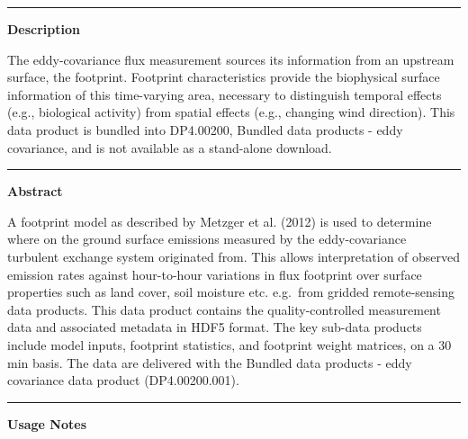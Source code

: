 \documentclass[]{article}
\begin{document}
\begin{center}\rule{0.5\linewidth}{\linethickness}\end{center}

\textbf{Description}

The eddy-covariance flux measurement sources its information from an
upstream surface, the footprint. Footprint characteristics provide the
biophysical surface information of this time-varying area, necessary to
distinguish temporal effects (e.g., biological activity) from spatial
effects (e.g., changing wind direction). This data product is bundled
into DP4.00200, Bundled data products - eddy covariance, and is not
available as a stand-alone download.

\begin{center}\rule{0.5\linewidth}{\linethickness}\end{center}

\textbf{Abstract}

A footprint model as described by Metzger et al. (2012) is used to
determine where on the ground surface emissions measured by the
eddy-covariance turbulent exchange system originated from. This allows
interpretation of observed emission rates against hour-to-hour
variations in flux footprint over surface properties such as land cover,
soil moisture etc. e.g.~from gridded remote-sensing data products. This
data product contains the quality-controlled measurement data and
associated metadata in HDF5 format. The key sub-data products include
model inputs, footprint statistics, and footprint weight matrices, on a
30 min basis. The data are delivered with the Bundled data products -
eddy covariance data product (DP4.00200.001).

\begin{center}\rule{0.5\linewidth}{\linethickness}\end{center}

\textbf{Usage Notes}
\end{document}
